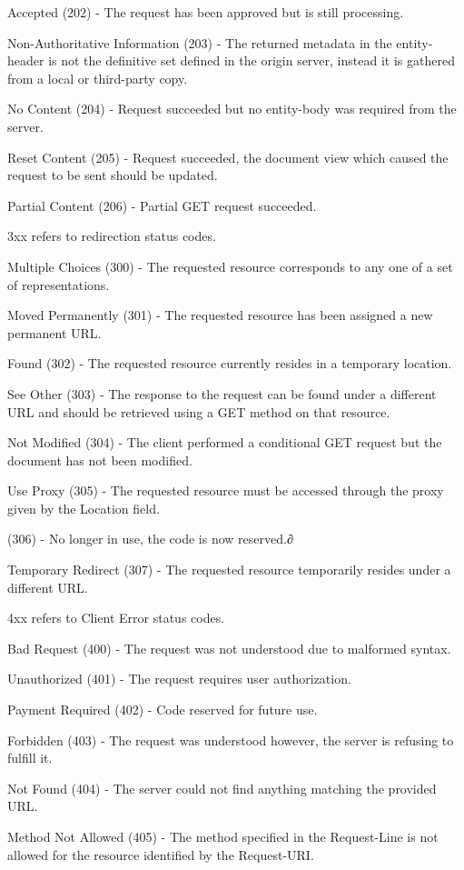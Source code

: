 \documentclass[titlepage]{article}
\begin{document}
Accepted (202) - The request has been approved but is still processing.

Non-Authoritative Information (203) - The returned metadata in the entity-header is not the definitive set defined in the origin server, instead it is gathered from a local or third-party copy.

No Content (204) - Request succeeded but no entity-body was required from the server.

Reset Content (205) - Request succeeded, the document view which caused the request to be sent should be updated.

Partial Content (206) - Partial GET request succeeded.

3xx refers to redirection status codes.

Multiple Choices (300) - The requested resource corresponds to any one of a set of representations.

Moved Permanently (301) - The requested resource has been assigned a new permanent URL.

Found (302) - The requested resource currently resides in a temporary location.

See Other (303) - The response to the request can be found under a different URL and should be retrieved using a GET method on that resource.

Not Modified (304) - The client performed a conditional GET request but the document has not been modified.

Use Proxy (305) - The requested resource must be accessed through the proxy given by the Location field.

(306) - No longer in use, the code is now reserved.∂

Temporary Redirect (307) - The requested resource temporarily resides under a different URL.

4xx refers to Client Error status codes.

Bad Request (400) - The request was not understood due to malformed syntax.

Unauthorized (401) - The request requires user authorization.

Payment Required (402) - Code reserved for future use.

Forbidden (403) - The request was understood however, the server is refusing to fulfill it.

Not Found (404) - The server could not find anything matching the provided URL.

Method Not Allowed (405) - The method specified in the Request-Line is not allowed for the resource identified by the Request-URI.
\end{document}

